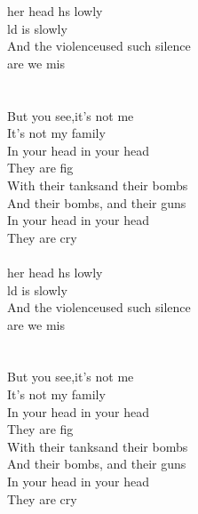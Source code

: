 \begin{cancion}%
	her head hs lowly\\
	ld is slowly   \\
	And the violenceused such silence\\
	 are we mis\\
	\jump\\
	\jump\\
	But you see,it's not me\\
	It's not my  family\\
	In your head  in your head\\
	They are fig\\
	With their tanksand their bombs\\
	And their bombs,  and their guns\\
	In your head   in your head \\
	They are cry\\
	\jump\\
	her head hs lowly\\
	ld is slowly   \\
	And the violenceused such silence\\
	 are we mis\\
	\jump\\
	\jump\\
	But you see,it's not me\\
	It's not my  family\\
	In your head  in your head\\
	They are fig\\
	With their tanksand their bombs\\
	And their bombs,  and their guns\\
	In your head   in your head \\
	They are cry\\
\end{cancion}%
